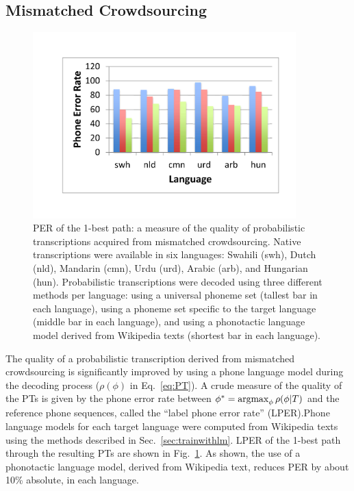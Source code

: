 \subsection{Mismatched Crowdsourcing}
\label{s6:mc}

\begin{figure}
  \centerline{\includegraphics[width=4in]{../figs/lm_results.pdf}}
  \caption{PER of the 1-best path: a measure of the quality of
    probabilistic transcriptions acquired from mismatched
    crowdsourcing.  Native transcriptions were available in six
    languages: Swahili (swh), Dutch (nld), Mandarin (cmn), Urdu (urd),
    Arabic (arb), and Hungarian (hun).  Probabilistic transcriptions
    were decoded using three different methods per language: using a
    universal phoneme set (tallest bar in each language), using a
    phoneme set specific to the target language (middle bar in each
    language), and using a phonotactic language model derived from
    Wikipedia texts (shortest bar in each language).}
  \label{fig:pt_decode_per}
\end{figure}

The quality of a probabilistic transcription derived from mismatched
crowdsourcing is significantly improved by using a phone language
model during the decoding process ($\rho(\phi)$ in Eq.~\ref{eq:PT}).
A crude measure of the quality of the PTs is given by the phone error
rate between $\phi^* = \operatorname*{argmax}_{\phi} \rho(\phi|T)$ and the reference
phone sequences, called the ``label phone error rate'' (LPER).Phone
language models for each target language were computed from Wikipedia
texts using the methods described in Sec.~\ref{sec:trainwithlm}.
LPER of the 1-best path through the resulting PTs are shown in
Fig.~\ref{fig:pt_decode_per}.  As shown, the use of a phonotactic
language model, derived from Wikipedia text, reduces PER by about 10\%
absolute, in each language.

